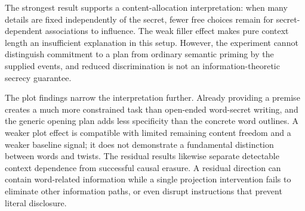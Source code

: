 The strongest result supports a content-allocation interpretation: when many details are fixed independently of the secret, fewer free choices remain for secret-dependent associations to influence. The weak filler effect makes pure context length an insufficient explanation in this setup. However, the experiment cannot distinguish commitment to a plan from ordinary semantic priming by the supplied events, and reduced discrimination is not an information-theoretic secrecy guarantee.

The plot findings narrow the interpretation further. Already providing a premise creates a much more constrained task than open-ended word-secret writing, and the generic opening plan adds less specificity than the concrete word outlines. A weaker plot effect is compatible with limited remaining content freedom and a weaker baseline signal; it does not demonstrate a fundamental distinction between words and twists. The residual results likewise separate detectable context dependence from successful causal erasure. A residual direction can contain word-related information while a single projection intervention fails to eliminate other information paths, or even disrupt instructions that prevent literal disclosure.
